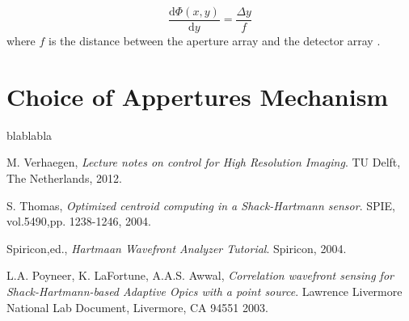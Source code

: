 \documentclass{article}
\begin{document}
\begin{equation}
\frac{\mathrm{d} \Phi(x,y)}{\mathrm{d} y}=\frac{\Delta y}{f}
\end{equation}
where $f$ is the distance between the aperture array and the detector array \cite{spiricon04}.

\section{Choice of Appertures Mechanism}

blablabla


\begin{thebibliography}{9}

  M. Verhaegen,
  \emph{Lecture notes on control for High Resolution Imaging}.
  TU Delft, 
  The Netherlands,
  2012.
  
  S. Thomas,
  \emph{Optimized centroid computing in a Shack-Hartmann sensor}.
  SPIE, 
  vol.5490,pp. 1238-1246,
  2004. 
  
  Spiricon,ed.,
  \emph{Hartmaan Wavefront Analyzer Tutorial}.
  Spiricon, 
  2004.
  
  L.A. Poyneer, K. LaFortune, A.A.S. Awwal,
  \emph{Correlation wavefront sensing for Shack-Hartmann-based Adaptive Opics with a point source}.
  Lawrence Livermore National Lab Document,
  Livermore, CA 94551
  2003.  

\end{thebibliography}
\end{document}
